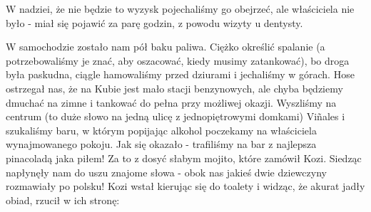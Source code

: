 W nadziei, że nie będzie to wyzysk pojechaliśmy go obejrzeć, ale właściciela nie było - miał się pojawić za parę godzin, z powodu wizyty u dentysty.
\par W samochodzie zostało nam pół baku paliwa.
Ciężko określić spalanie (a potrzebowaliśmy je znać, aby oszacować, kiedy musimy zatankować), bo droga była paskudna, ciągle hamowaliśmy przed dziurami i jechaliśmy w górach.
Hose ostrzegał nas, że na Kubie jest mało stacji benzynowych, ale chyba będziemy dmuchać na zimne i tankować do pełna przy możliwej okazji.
Wyszliśmy na centrum (to duże słowo na jedną ulicę z jednopiętrowymi domkami) Viñales i szukaliśmy baru, w którym popijając alkohol poczekamy na właściciela wynajmowanego pokoju.
Jak się okazało - trafiliśmy na bar z najlepsza pinacoladą jaka piłem!
Za to z dosyć słabym mojito, które zamówił Kozi.
Siedząc napłynęły nam do uszu znajome słowa - obok nas jakieś dwie dziewczyny rozmawiały po polsku!
Kozi wstał kierując się do toalety i widząc, że akurat jadły obiad, rzucił w ich stronę:


